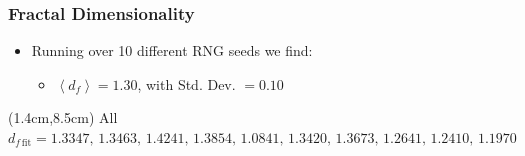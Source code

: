 \documentclass[mathserif,18pt,xcolor=table]{beamer}
\begin{document}
\begin{frame}
  \frametitle{Fractal Dimensionality}

  \begin{itemize}
    \item Running over 10 different RNG seeds we find:
    \begin{itemize}
      \item $\left<d_{f}\right> = 1.30$, with Std. Dev. $= 0.10$ 
    \end{itemize}
  \end{itemize}

\begin{textblock*}{0.9\textwidth}(1.4cm,8.5cm) %
{\tiny All $d_{f\,\mathrm{fit}} = 1.3347,\,1.3463,\,1.4241,\,1.3854,\,1.0841,\,1.3420,\,1.3673,\,1.2641,\,1.2410,\,1.1970$}
\end{textblock*}

\end{frame}
\end{document}
